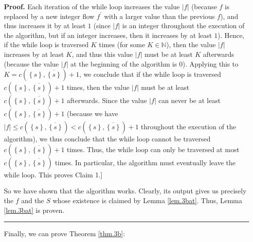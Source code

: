 \documentclass[numbers=enddot,12pt,final,onecolumn,notitlepage]{scrartcl}%
\theoremstyle{definition}
\newenvironment{proof}[1][Proof]{\noindent\textbf{#1.} }{\ \rule{0.5em}{0.5em}}
\begin{document}
\begin{proof}
Each iteration of the while loop increases the value $\left\vert f\right\vert
$ (because $f$ is replaced by a new integer flow $f^{\prime}$ with a larger
value than the previous $f$), and thus increases it by at least $1$ (since
$\left\vert f\right\vert $ is an integer throughout the execution of the
algorithm, but if an integer increases, then it increases by at least $1$).
Hence, if the while loop is traversed $K$ times (for some $K\in\mathbb{N}$),
then the value $\left\vert f\right\vert $ increases by at least $K$, and thus
this value $\left\vert f\right\vert $ must be at least $K$ afterwards (because
the value $\left\vert f\right\vert $ at the beginning of the algorithm is
$0$). Applying this to $K=c\left(  \left\{  s\right\}  ,\overline{\left\{
s\right\}  }\right)  +1$, we conclude that if the while loop is traversed
$c\left(  \left\{  s\right\}  ,\overline{\left\{  s\right\}  }\right)  +1$
times, then the value $\left\vert f\right\vert $ must be at least $c\left(
\left\{  s\right\}  ,\overline{\left\{  s\right\}  }\right)  +1$ afterwards.
Since the value $\left\vert f\right\vert $ can never be at least $c\left(
\left\{  s\right\}  ,\overline{\left\{  s\right\}  }\right)  +1$ (because we
have $\left\vert f\right\vert \leq c\left(  \left\{  s\right\}  ,\overline
{\left\{  s\right\}  }\right)  <c\left(  \left\{  s\right\}  ,\overline
{\left\{  s\right\}  }\right)  +1$ throughout the execution of the algorithm),
we thus conclude that the while loop cannot be traversed $c\left(  \left\{
s\right\}  ,\overline{\left\{  s\right\}  }\right)  +1$ times. Thus, the while
loop can only be traversed at most $c\left(  \left\{  s\right\}
,\overline{\left\{  s\right\}  }\right)  $ times. In particular, the algorithm
must eventually leave the while loop. This proves Claim 1.]

So we have shown that the algorithm works. Clearly, its output gives us
precisely the $f$ and the $S$ whose existence is claimed by Lemma
\ref{lem.3bat}. Thus, Lemma \ref{lem.3bat} is proven.
\end{proof}

Finally, we can prove Theorem \ref{thm.3b}:
\end{document}
